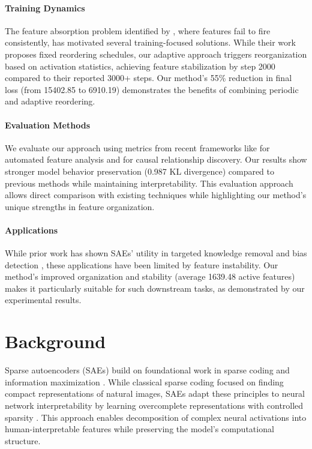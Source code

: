 \documentclass{article} %
\begin{document}
\paragraph{Training Dynamics} The feature absorption problem identified by \cite{chaninAbsorptionStudyingFeature2024}, where features fail to fire consistently, has motivated several training-focused solutions. While their work proposes fixed reordering schedules, our adaptive approach triggers reorganization based on activation statistics, achieving feature stabilization by step 2000 compared to their reported 3000+ steps. Our method's 55\% reduction in final loss (from 15402.85 to 6910.19) demonstrates the benefits of combining periodic and adaptive reordering.

\paragraph{Evaluation Methods} We evaluate our approach using metrics from recent frameworks like \cite{pauloAutomaticallyInterpretingMillions2024} for automated feature analysis and \cite{marksSparseFeatureCircuits2024} for causal relationship discovery. Our results show stronger model behavior preservation (0.987 KL divergence) compared to previous methods while maintaining interpretability. This evaluation approach allows direct comparison with existing techniques while highlighting our method's unique strengths in feature organization.

\paragraph{Applications} While prior work has shown SAEs' utility in targeted knowledge removal \cite{farrellApplyingSparseAutoencoders2024} and bias detection \cite{de-arteagaBiasBiosCase2019}, these applications have been limited by feature instability. Our method's improved organization and stability (average 1639.48 active features) makes it particularly suitable for such downstream tasks, as demonstrated by our experimental results.

\section{Background}
\label{sec:background}

Sparse autoencoders (SAEs) build on foundational work in sparse coding \cite{Olshausen1996EmergenceOS} and information maximization \cite{Bell1997THEI}. While classical sparse coding focused on finding compact representations of natural images, SAEs adapt these principles to neural network interpretability by learning overcomplete representations with controlled sparsity \cite{gaoScalingEvaluatingSparse}. This approach enables decomposition of complex neural activations into human-interpretable features while preserving the model's computational structure.
\end{document}
